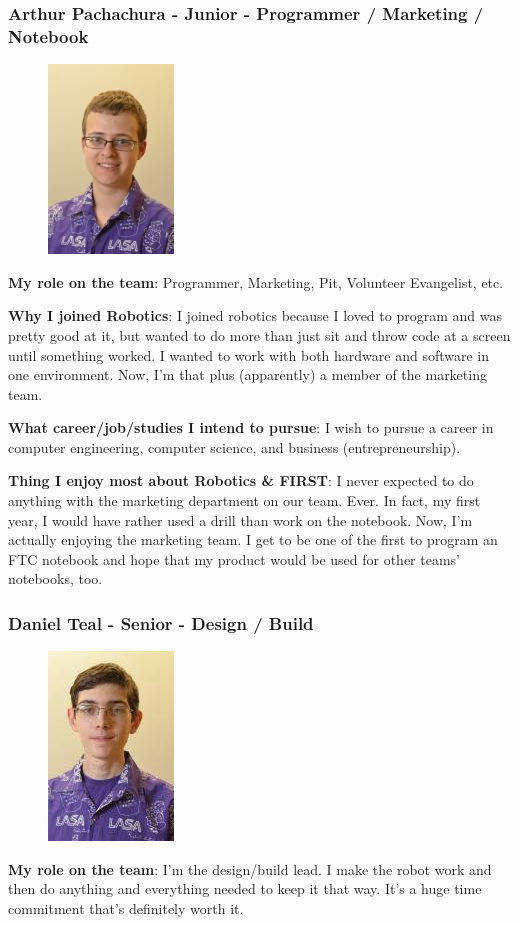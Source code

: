 \subsubsection{Arthur Pachachura - Junior - Programmer /  Marketing / Notebook} 
\begin{figure}[H]
	\includegraphics[width=0.2\linewidth]{arthur}
\end{figure}
{\bf My role on the team}: Programmer, Marketing, Pit, Volunteer Evangelist, etc.

{\bf Why I joined Robotics}: I joined robotics because I loved to program and was pretty good at it, but wanted to do more than just sit and throw code at a screen until something worked.  I wanted to work with both hardware and software in one environment.  Now, I'm that plus (apparently) a member of the marketing team.

{\bf What career/job/studies I intend to pursue}: I wish to pursue a career in computer engineering, computer science, and business (entrepreneurship).

{\bf Thing I enjoy most about Robotics \& FIRST}: I never expected to do anything with the marketing department on our team.  Ever.  In fact, my first year, I would have rather used a drill than work on the notebook.  Now, I'm actually enjoying the marketing team.  I get to be one of the first to program an FTC notebook and hope that my product would be used for other teams' notebooks, too.

\subsubsection{Daniel Teal - Senior - Design / Build} 
\begin{figure}[H]
	\includegraphics[width=0.2\linewidth]{daniel}
\end{figure}
{\bf My role on the team}: I'm the design/build lead. I make the robot work and then do anything and everything needed to keep it that way. It's a huge time commitment that's definitely worth it.

